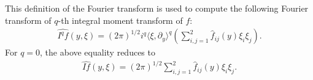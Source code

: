 \documentclass[11pt]{article}
\newcommand{\vf}{\varphi}
\newcommand{\Fc}{\mathcal{F}}
\newcommand{\Sc}{\mathcal{S}}
\newcommand{\Rb}{\mathbb{R}}
\newcommand{\Sb}{\mathbb{S}}
\renewcommand{\l}{\langle}
\renewcommand{\r}{\rangle}
\begin{document}
This definition of the Fourier transform is used to compute the following Fourier transform of $q$-th integral moment transform of $f$:
\begin{align*}
    \widehat{I^q f}(y, \xi) = (2 \pi)^{1/2} i^q \langle \xi, \partial_y\rangle^q \left(  \sum_{i,j=1}^2\widehat{f}_{ij}(y) \xi_i\xi_j\right).
\end{align*}
For $q=0$, the above equality reduces to
\begin{align*}
    \widehat{I f}(y, \xi) = (2 \pi)^{1/2}  \sum_{i,j=1}^2 \widehat{f}_{ij}(y) \xi_i\xi_j.
\end{align*}
\end{document}
